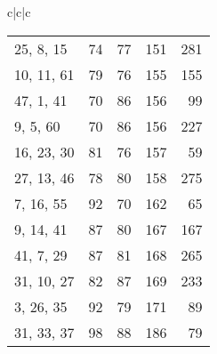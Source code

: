 \documentclass{acmsmalltr}
\newcommand{\xst}[3]{#1, #2, #3}
\begin{document}
\begin{sidewaystable}
{\begin{tabular}{c|c|c}
\begin{tabular}{l|rr|r|r}
\xst{25}{8}{15} & 74 & 77 & 151 & 281\\
\xst{10}{11}{61} & 79 & 76 & 155 & 155\\
\xst{47}{1}{41} & 70 & 86 & 156 & 99\\
\xst{9}{5}{60} & 70 & 86 & 156 & 227\\
\xst{16}{23}{30} & 81 & 76 & 157 & 59\\
\xst{27}{13}{46} & 78 & 80 & 158 & 275\\
\xst{7}{16}{55} & 92 & 70 & 162 & 65\\
\xst{9}{14}{41} & 87 & 80 & 167 & 167\\
\xst{41}{7}{29} & 87 & 81 & 168 & 265\\
\xst{31}{10}{27} & 82 & 87 & 169 & 233\\
\xst{3}{26}{35} & 92 & 79 & 171 & 89\\
\xst{31}{33}{37} & 98 & 88 & 186 & 79\\
\end{tabular}
\end{tabular}}
\end{sidewaystable}
\end{document}
